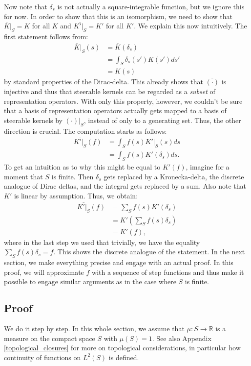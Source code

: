\documentclass[12pt, a4paper]{article}
\theoremstyle{plain}
\theoremstyle{definition}
\theoremstyle{remark}
\newcommand{\R}{\mathds{R}}
\begin{document}
Now note that $\delta_s$ is not actually a square-integrable function, but we ignore this for now. In order to show that this is an isomorphism, we need to show that $\overline{K}|_S = K$ for all $K$ and $\overline{K'|_S} = K'$ for all $K'$. We explain this now intuitively. The first statement follows from:
\begin{align*}
\overline{K}|_S(s) & = \overline{K}(\delta_s) \\
& = \int_S \delta_s(s')K(s')ds' \\
& = K(s)
\end{align*}
by standard properties of the Dirac-delta. This already shows that $\overline{(\cdot)}$ is injective and thus that steerable kernels can be regarded as a \emph{subset} of representation operators. With only this property, however, we couldn't be sure that a basis of representation operators actually gets mapped to a basis of steerable kernels by $(\cdot)|_S$, instead of only to a generating set. Thus, the other direction is crucial. The computation starts as follows:
\begin{align*}
\overline{K'|_S}(f) & = \int_{S} f(s) K'|_S(s) ds \\
& = \int_S f(s) K'(\delta_s)ds.
\end{align*}
To get an intuition as to why this might be equal to $K'(f)$, imagine for a moment that $S$ is finite. Then $\delta_s$ gets replaced by a Kronecka-delta, the discrete analogue of Dirac deltas, and the integral gets replaced by a sum. Also note that $K'$ is linear by assumption. Thus, we obtain:
\begin{align*}
\overline{K'|_S}(f) & = \sum_{S} f(s)K'(\delta_s) \\
& = K'\left(\sum_{S} f(s) \delta_s \right) \\
& = K'(f),
\end{align*}
where in the last step we used that trivially, we have the equality $\sum_{S} f(s) \delta_s = f$. This shows the discrete analogue of the statement. In the next section, we make everything precise and engage with an actual proof. In this proof, we will approximate $f$ with a sequence of step functions and thus make it possible to engage similar arguments as in the case where $S$ is finite.

\subsection{Proof}

We do it step by step. In this whole section, we assume that $\mu: S \to \R$ is a measure on the compact space $S$ with $\mu(S) = 1$. See also Appendix \ref{topological_closures} for more on topological considerations, in particular how continuity of functions on $L^2(S)$ is defined.
\end{document}
